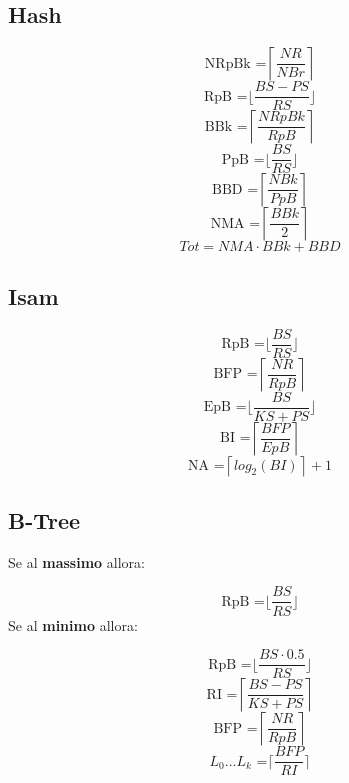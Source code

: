 \documentclass{article}
\begin{document}
\subsection{Hash}
\[ \text{NRpBk =} \left\lceil \frac{NR}{NBr} \right\rceil\]
\[ \text{RpB =} \biggl\lfloor \frac{BS-PS}{RS} \biggr\rfloor\]
\[ \text{BBk =} \left\lceil \frac{NRpBk}{RpB} \right\rceil\]
\[ \text{PpB =} \biggl\lfloor \frac{BS}{RS} \biggr\rfloor\]
\[ \text{BBD =} \left\lceil \frac{NBk}{PpB} \right\rceil\]
\[ \text{NMA =} \left\lceil \frac{BBk}{2} \right\rceil\]
\[Tot = NMA \cdot BBk + BBD \]

\subsection{Isam}
\[ \text{RpB =} \biggl\lfloor \frac{BS}{RS} \biggr\rfloor\]
\[ \text{BFP =} \left\lceil \frac{NR}{RpB} \right\rceil\]
\[ \text{EpB =} \biggl\lfloor \frac{BS}{KS + PS} \biggr\rfloor\]
\[ \text{BI =} \left\lceil \frac{BFP}{EpB} \right\rceil\]
\[ \text{NA =} \left\lceil log_2(BI) \right\rceil +1 \]

\subsection{B-Tree}
Se al \textbf{massimo} allora:\par
\[ \text{RpB =} \biggl\lfloor \frac{BS}{RS} \biggr\rfloor\]
Se al \textbf{minimo} allora:\par
\[ \text{RpB =} \biggl\lfloor \frac{BS \cdot 0.5}{RS} \biggr\rfloor\]
\[ \text{RI =} \left\lceil \frac{BS - PS}{KS + PS} \right\rceil\]
\[ \text{BFP =} \left\lceil \frac{NR}{RpB} \right\rceil\]
\[ \text{$L_0 \dots L_k$ =} \biggl\lceil \frac{BFP}{RI} \biggr\rceil\]








\end{document}
